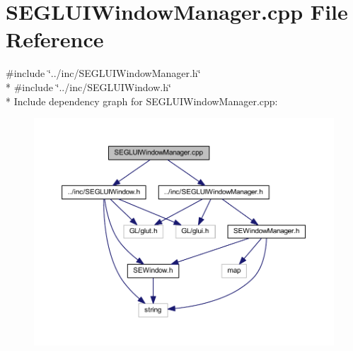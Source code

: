 \section{S\+E\+G\+L\+U\+I\+Window\+Manager.\+cpp File Reference}
\label{_s_e_g_l_u_i_window_manager_8cpp}
{\ttfamily \#include \char`\"{}../inc/\+S\+E\+G\+L\+U\+I\+Window\+Manager.\+h\char`\"{}}\\*
{\ttfamily \#include \char`\"{}../inc/\+S\+E\+G\+L\+U\+I\+Window.\+h\char`\"{}}\\*
Include dependency graph for S\+E\+G\+L\+U\+I\+Window\+Manager.\+cpp\+:
\nopagebreak
\begin{figure}[H]
\begin{center}
\leavevmode
\includegraphics[width=350pt]{_s_e_g_l_u_i_window_manager_8cpp__incl}
\end{center}
\end{figure}
